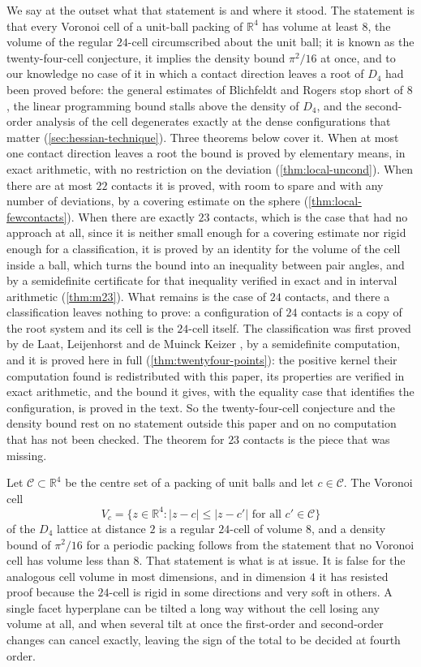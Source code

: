 \documentclass[11pt,reqno]{amsart}
\renewcommand{\_}{\origunderscore\allowbreak}
\numberwithin{equation}{section}
\theoremstyle{plain}
\theoremstyle{definition}
\theoremstyle{remark}
\begin{document}
We say at the outset what that statement is and where it
stood. The statement is that every Voronoi cell of a unit-ball packing
of $\mathbb{R}^4$ has volume at least $8$, the volume of the regular
$24$-cell circumscribed about the unit ball; it is known as the
twenty-four-cell conjecture, it implies the density bound $\pi^2/16$
at once, and to our knowledge no case of it in which a contact
direction leaves a root of $D_4$ had been proved before: the general
estimates of Blichfeldt and Rogers stop short of $8$, the linear
programming bound stalls above the density of $D_4$, and the
second-order analysis of the cell degenerates exactly at the dense
configurations that matter (\cref{sec:hessian-technique}). Three
theorems below cover it. When at most one contact direction leaves a
root the bound is proved by elementary means, in exact arithmetic, with
no restriction on the deviation (\cref{thm:local-uncond}). When there
are at most $22$ contacts it is proved, with room to spare and with any
number of deviations, by a covering estimate on the sphere
(\cref{thm:local-fewcontacts}). When there are exactly $23$ contacts,
which is the case that had no approach at all, since it is neither
small enough for a covering estimate nor rigid enough for a
classification, it is proved by an identity for the volume of the cell
inside a ball, which turns the bound into an inequality between pair
angles, and by a semidefinite certificate for that inequality verified
in exact and in interval arithmetic (\cref{thm:m23}). What remains is
the case of $24$ contacts, and there a classification leaves nothing to
prove: a configuration of $24$ contacts is a copy of the root system and
its cell is the $24$-cell itself. The classification was first proved by
de Laat, Leijenhorst and de Muinck Keizer \cite{LLM24}, by a semidefinite
computation, and it is proved here in full (\cref{thm:twentyfour-points}):
the positive kernel their computation found is redistributed with this
paper, its properties are verified in exact arithmetic, and the bound it
gives, with the equality case that identifies the configuration, is
proved in the text. So the twenty-four-cell conjecture and the density
bound rest on no statement outside this paper and on no computation that
has not been checked. The theorem for $23$ contacts is the piece that was
missing.

Let $\mathcal{C}\subset\mathbb{R}^4$ be the centre set of a packing of
unit balls and let $c\in\mathcal{C}$. The Voronoi cell
\[
  V_c=\bigl\{z\in\mathbb{R}^4 : |z-c|\le|z-c'| \text{ for all } c'\in\mathcal{C}\bigr\}
\]
of the $D_4$ lattice at distance $2$ is a regular $24$-cell of volume
$8$, and a density bound of $\pi^2/16$ for a periodic packing follows
from the statement that no Voronoi cell has volume less than $8$. That
statement is what is at issue. It is false for the analogous cell
volume in most dimensions, and in dimension $4$ it has resisted proof
because the $24$-cell is rigid in some directions and very soft in
others. A single facet hyperplane can be tilted a long way without the
cell losing any volume at all, and when several tilt at once the
first-order and second-order changes can cancel exactly, leaving the
sign of the total to be decided at fourth order.
\end{document}
